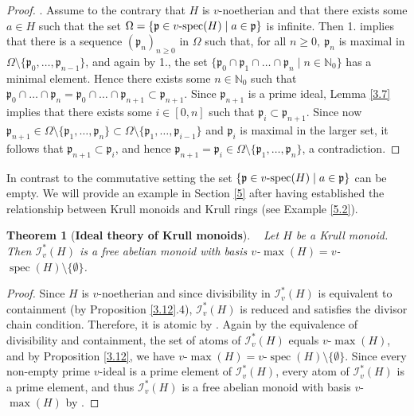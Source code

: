 \documentclass[a4paper]{amsart}
\newtheorem{theorem}{Theorem}[section]
\theoremstyle{definition}
\numberwithin{equation}{section}
\begin{document}
\begin{proof}
. Assume to the contrary that $H$ is  $v$-noetherian and that there exists some $a \in H$ such that
the set $\Omega = \{\mathfrak p \in v\text{\rm -spec}(H) \mid a \in
\mathfrak p\}$ is infinite. Then 1. implies that there is a sequence
$(\mathfrak p_n)_{n\ge 0}$ in $\Omega$ such that, for all $n\ge 0,\
\mathfrak p_n$ is maximal in $\Omega\setminus \{\mathfrak
p_0,\dots,\mathfrak p_{n-1}\}$, and again by 1., the set
$\{\mathfrak p_0 \cap \mathfrak p_1 \cap \ldots \cap \mathfrak p_n
\mid n \in {\mathbb N}_0\}$ has a minimal element. Hence there exists some $n
\in {\mathbb N}_0$ such that $\mathfrak p_0 \cap \dots \cap \mathfrak p_n =
\mathfrak p_0 \cap \dots \cap \mathfrak p_{n+1} \subset \mathfrak
p_{n+1}$. Since $\mathfrak p_{n+1}$ is a prime ideal, Lemma
\ref{3.7} implies that there exists some $i\in [0,n]$ such that
$\mathfrak p_i \subset \mathfrak p_{n+1}$. Since now $\mathfrak
p_{n+1}\in \Omega \setminus \{ \mathfrak p_1, \ldots, \mathfrak
p_n\} \subset \Omega \setminus \{ \mathfrak p_1, \ldots, \mathfrak
p_{i-1} \}$ and $\mathfrak p_i$ is maximal in the larger set, it
follows that $\mathfrak p_{n+1} \subset \mathfrak p_i$, and hence
$\mathfrak p_{n+1} = \mathfrak p_i \in  \Omega \setminus \{\mathfrak
p_1, \ldots, \mathfrak p_n\}$, a contradiction.
\end{proof}

\medskip
In contrast to the commutative setting the set $\{ \mathfrak p \in v\text{\rm
-spec}(H) \mid a \in \mathfrak p\}$ can be empty. We will provide an example in Section \ref{5} after having established the relationship between Krull monoids and Krull rings (see Example \ref{5.2}).

\medskip
\begin{theorem}[\bf Ideal theory of Krull monoids] \label{3.14}~
Let $H$ be a Krull monoid. Then $\mathcal I_v^* (H)$ is a free
abelian monoid with basis $v$-$\max (H) = v$-$\operatorname{spec} (H) \setminus
\{\emptyset\}$.
\end{theorem}

\begin{proof}
Since $H$ is $v$-noetherian and since divisibility in $\mathcal
I_v^* (H)$ is equivalent to containment (by Proposition
\ref{3.12}.4), $\mathcal I_v^* (H)$ is reduced and satisfies the
divisor chain condition. Therefore, it is atomic by
\cite[Proposition 1.1.4]{Ge-HK06a}. Again by the equivalence of
divisibility and containment, the set of atoms of $\mathcal I_v^*
(H)$ equals $v$-$\max (H)$, and by Proposition \ref{3.12}, we have
$v$-$\max (H) = v$-$\operatorname{spec} (H) \setminus \{\emptyset\}$. Since every
non-empty prime $v$-ideal is a prime element of $\mathcal I_v^*
(H)$, every atom of $\mathcal I_v^* (H)$ is a prime element,  and
thus $\mathcal I_v^* (H)$ is a free abelian monoid with basis
$v$-$\max (H)$ by \cite[1.1.10 and 1.2.2]{Ge-HK06a}.
\end{proof}
\end{document}
